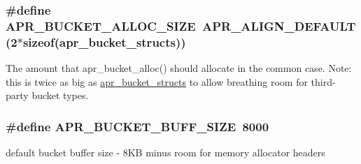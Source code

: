 \subsubsection[{\texorpdfstring{A\+P\+R\+\_\+\+B\+U\+C\+K\+E\+T\+\_\+\+A\+L\+L\+O\+C\+\_\+\+S\+I\+ZE}{APR_BUCKET_ALLOC_SIZE}}]{\setlength{\rightskip}{0pt plus 5cm}\#define A\+P\+R\+\_\+\+B\+U\+C\+K\+E\+T\+\_\+\+A\+L\+L\+O\+C\+\_\+\+S\+I\+ZE~{\bf A\+P\+R\+\_\+\+A\+L\+I\+G\+N\+\_\+\+D\+E\+F\+A\+U\+LT}(2$\ast$sizeof({\bf apr\+\_\+bucket\+\_\+structs}))}\hypertarget{group__APR__Util__Bucket__Brigades_gae3ccf4c383c9e7fea28354cc8e029626}{}\label{group__APR__Util__Bucket__Brigades_gae3ccf4c383c9e7fea28354cc8e029626}
The amount that apr\+\_\+bucket\+\_\+alloc() should allocate in the common case. Note\+: this is twice as big as \hyperlink{unionapr__bucket__structs}{apr\+\_\+bucket\+\_\+structs} to allow breathing room for third-\/party bucket types. 
\subsubsection[{\texorpdfstring{A\+P\+R\+\_\+\+B\+U\+C\+K\+E\+T\+\_\+\+B\+U\+F\+F\+\_\+\+S\+I\+ZE}{APR_BUCKET_BUFF_SIZE}}]{\setlength{\rightskip}{0pt plus 5cm}\#define A\+P\+R\+\_\+\+B\+U\+C\+K\+E\+T\+\_\+\+B\+U\+F\+F\+\_\+\+S\+I\+ZE~8000}\hypertarget{group__APR__Util__Bucket__Brigades_ga82bf404af30875135c65e2c13ad035e5}{}\label{group__APR__Util__Bucket__Brigades_ga82bf404af30875135c65e2c13ad035e5}
default bucket buffer size -\/ 8\+KB minus room for memory allocator headers 
